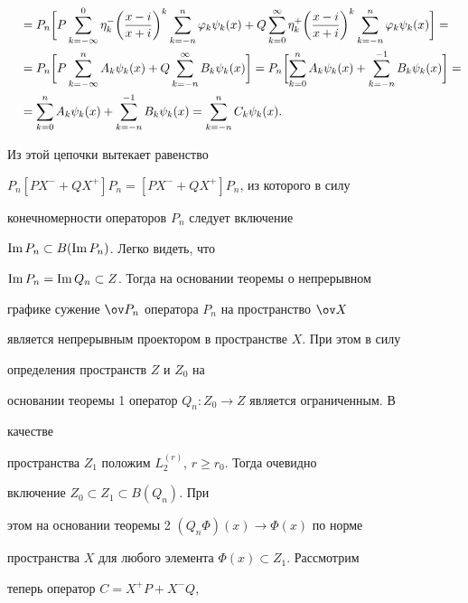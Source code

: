 \begin{pf}
\begin{align}
%


&\quad =P_n\biggl[P\sum^0_{k=-\infty}\eta^-_k 


\biggl(\frac{x-i}{x+i}\biggr)^k\sum^n_{k=-n}\varphi_k\psi_k(x)+ 


Q\sum^\infty_{k=0}\eta^+_k\biggl(\frac{x-i}{x+i}\biggr)^k 


\sum^n_{k=-n}\varphi_k\psi_k(x)\biggr]=\notag \\ 


%


&\quad =P_n\biggl[P\sum^n_{k=-\infty}A_k\psi_k(x)+


Q\sum^\infty_{k=-n}B_k\psi_k(x)\biggr]= 


P_n\biggl[\sum^n_{k=0}A_k\psi_k(x)+


\sum^{-1}_{k=-n}B_k\psi_k(x)\biggr]=\notag \\


%


&\quad=\sum^n_{k=0}A_k\psi_k(x)+\sum^{-1}_{k=-n} 


B_k\psi_k(x)=\sum^n_{k=-n}C_k\psi_k(x).


\end{align} 


Из этой цепочки вытекает равенство 


$P_n[PX^-+QX^+]P_n=[PX^-+QX^+]P_n$, из которого в силу 


конечномерности операторов $P_n$ следует включение 


$\operatorname{Im} P_n\subset B(\operatorname{Im} P_n)$. Легко видеть, что 


$\operatorname{Im} P_n=\operatorname{Im} Q_n\subset Z$. Тогда на основании теоремы о непрерывном 


графике сужение $\ov P_n$ оператора $P_n$ на пространство $\ov X$ 


является непрерывным проектором в пространстве $X$. При этом в силу 


определения пространств $Z$ и $Z_0$ на 


основании теоремы 1 оператор $Q_n:Z_0\to Z$ является ограниченным. В 


качестве 


пространства $Z_1$ положим $L^{(r)}_2$, $r\ge r_0$. Тогда очевидно 


включение $Z_0\subset Z_1\subset B(Q_n)$. При 


этом на основании теоремы 2\; $(Q_n\Phi)(x)\to\Phi(x)$ по норме 


пространства $X$ для любого элемента $\Phi(x)\subset Z_1$. Рассмотрим 


теперь оператор $C=X^+P+X^-Q$, 



\end{pf}
